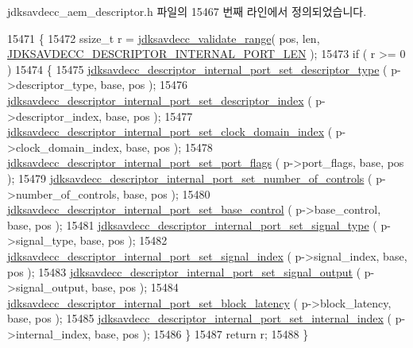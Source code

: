 jdksavdecc\+\_\+aem\+\_\+descriptor.\+h 파일의 15467 번째 라인에서 정의되었습니다.


\begin{DoxyCode}
15471 \{
15472     ssize\_t r = \hyperlink{group__util_ga9c02bdfe76c69163647c3196db7a73a1}{jdksavdecc\_validate\_range}( pos, len, 
      \hyperlink{group__descriptor__internal__port_gac3707c07b819a8bace60978c44d34598}{JDKSAVDECC\_DESCRIPTOR\_INTERNAL\_PORT\_LEN} );
15473     \textcolor{keywordflow}{if} ( r >= 0 )
15474     \{
15475         \hyperlink{group__descriptor__internal__port_ga2562608d08eff738332701b9fba95b47}{jdksavdecc\_descriptor\_internal\_port\_set\_descriptor\_type}
      ( p->descriptor\_type, base, pos );
15476         \hyperlink{group__descriptor__internal__port_ga36bd33f8034ea733cd2c837082609adb}{jdksavdecc\_descriptor\_internal\_port\_set\_descriptor\_index}
      ( p->descriptor\_index, base, pos );
15477         \hyperlink{group__descriptor__internal__port_ga1e191cb1adb0bfe2e78a2eea70ad6e52}{jdksavdecc\_descriptor\_internal\_port\_set\_clock\_domain\_index}
      ( p->clock\_domain\_index, base, pos );
15478         \hyperlink{group__descriptor__internal__port_gafb65af31cf756288670103ef0228d290}{jdksavdecc\_descriptor\_internal\_port\_set\_port\_flags}
      ( p->port\_flags, base, pos );
15479         \hyperlink{group__descriptor__internal__port_ga92289cae4a94553e8c4573d42e4ff9d1}{jdksavdecc\_descriptor\_internal\_port\_set\_number\_of\_controls}
      ( p->number\_of\_controls, base, pos );
15480         \hyperlink{group__descriptor__internal__port_ga6ec8e8f90851221be130e3532c4c4ec5}{jdksavdecc\_descriptor\_internal\_port\_set\_base\_control}
      ( p->base\_control, base, pos );
15481         \hyperlink{group__descriptor__internal__port_ga5f0e2281c329c3c41d540cb80539c3d9}{jdksavdecc\_descriptor\_internal\_port\_set\_signal\_type}
      ( p->signal\_type, base, pos );
15482         \hyperlink{group__descriptor__internal__port_gaf617eb6a3a3777873effb6ae59f82e07}{jdksavdecc\_descriptor\_internal\_port\_set\_signal\_index}
      ( p->signal\_index, base, pos );
15483         \hyperlink{group__descriptor__internal__port_ga135b05de8c567e00b1f662cf8204fa6a}{jdksavdecc\_descriptor\_internal\_port\_set\_signal\_output}
      ( p->signal\_output, base, pos );
15484         \hyperlink{group__descriptor__internal__port_ga249a80a69ae2c9f45b3aa31b9d823ded}{jdksavdecc\_descriptor\_internal\_port\_set\_block\_latency}
      ( p->block\_latency, base, pos );
15485         \hyperlink{group__descriptor__internal__port_ga0f7301c80e3e987780e9f10a08d81463}{jdksavdecc\_descriptor\_internal\_port\_set\_internal\_index}
      ( p->internal\_index, base, pos );
15486     \}
15487     \textcolor{keywordflow}{return} r;
15488 \}
\end{DoxyCode}


